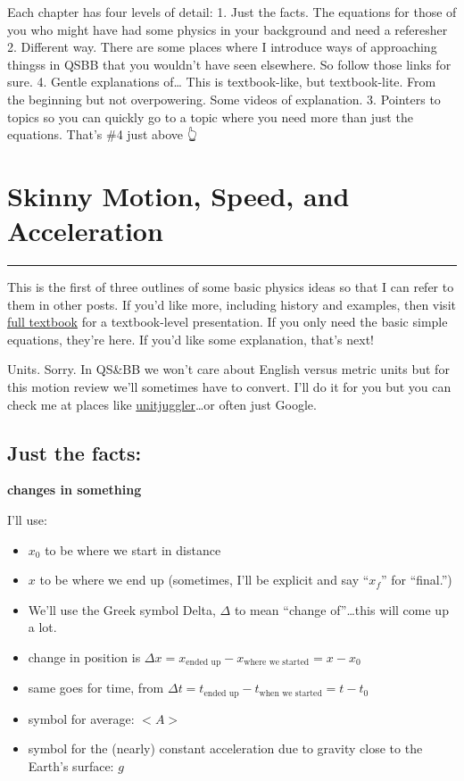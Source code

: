 \documentclass[
  letterpaper,
  DIV=11,
  numbers=noendperiod,
  oneside]{scrreprt}
\providecommand{\tightlist}{%
  \setlength{\itemsep}{0pt}\setlength{\parskip}{0pt}}\usepackage{longtable,booktabs,array}
\begin{document}
Each chapter has four levels of detail: 1. Just the facts. The equations
for those of you who might have had some physics in your background and
need a referesher 2. Different way. There are some places where I
introduce ways of approaching thingss in QSBB that you wouldn't have
seen elsewhere. So follow those links for sure. 4. Gentle explanations
of\ldots{} This is textbook-like, but textbook-lite. From the beginning
but not overpowering. Some videos of explanation. 3. Pointers to topics
so you can quickly go to a topic where you need more than just the
equations. That's \#4 just above 👆

\chapter{Skinny Motion, Speed, and
Acceleration}\label{skinny-motion-speed-and-acceleration}

\begin{center}\rule{0.5\linewidth}{0.5pt}\end{center}

This is the first of three outlines of some basic physics ideas so that
I can refer to them in other posts. If you'd like more, including
history and examples, then visit
\href{https://qstbb.pa.msu.edu/storage/ISP220_fall2020/QS&BB2020/intro.html}{full
textbook} for a textbook-level presentation. If you only need the basic
simple equations, they're here. If you'd like some explanation, that's
next!

Units. Sorry. In QS\&BB we won't care about English versus metric units
but for this motion review we'll sometimes have to convert. I'll do it
for you but you can check me at places like
\href{https://www.unitjuggler.com/index.html}{unitjuggler}\ldots or
often just Google.

\section{Just the facts:}\label{just-the-facts}

\textbf{changes in something}

I'll use:

\begin{itemize}
\tightlist
\item
  \(x_0\) to be where we start in distance
\item
  \(x\) to be where we end up (sometimes, I'll be explicit and say
  ``\(x_f\)'' for ``final.'')
\item
  We'll use the Greek symbol Delta, \(\Delta\) to mean ``change
  of''\ldots this will come up a lot.
\item
  change in position is
  \(\Delta x = x_{\text{ended up}}-x_{\text{where we started}} = x-x_0\)
\item
  same goes for time, from
  \(\Delta t= t_{\text{ended up}}-t_{\text{when we started}} = t - t_0\)
\item
  symbol for average: \(<A>\)
\item
  symbol for the (nearly) constant acceleration due to gravity close to
  the Earth's surface: \(g\)
\end{itemize}
\end{document}
